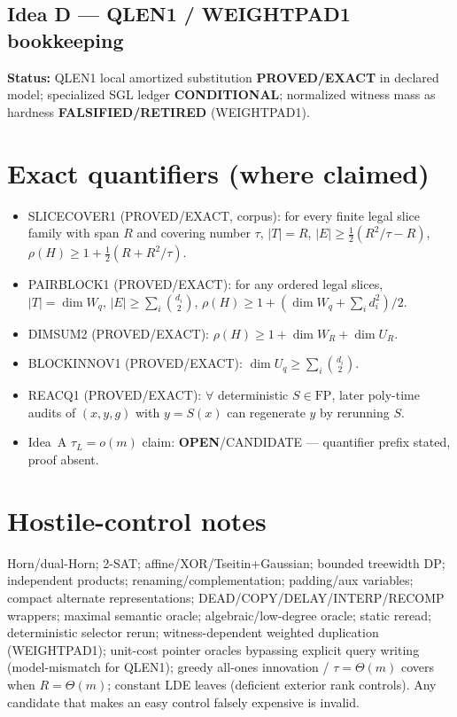 \documentclass[11pt]{article}
\begin{document}
\subsection*{Idea D --- QLEN1 / WEIGHTPAD1 bookkeeping}
\textbf{Status:} QLEN1 local amortized substitution \textbf{PROVED/EXACT} in declared model;
specialized SGL ledger \textbf{CONDITIONAL}; normalized witness mass as hardness
\textbf{FALSIFIED/RETIRED} (WEIGHTPAD1).

\section*{Exact quantifiers (where claimed)}
\begin{itemize}
\item SLICECOVER1 (PROVED/EXACT, corpus): for every finite legal slice family with span $R$ and
covering number $\tau$,
$|T|=R$, $|E|\ge\tfrac12(R^2/\tau-R)$,
$\rho(H)\ge 1+\tfrac12(R+R^2/\tau)$.
\item PAIRBLOCK1 (PROVED/EXACT): for any ordered legal slices,
$|T|=\dim W_q$, $|E|\ge\sum_i\binom{d_i}{2}$,
$\rho(H)\ge 1+(\dim W_q+\sum_i d_i^2)/2$.
\item DIMSUM2 (PROVED/EXACT): $\rho(H)\ge 1+\dim W_R+\dim U_R$.
\item BLOCKINNOV1 (PROVED/EXACT): $\dim U_q\ge\sum_i\binom{d_i}{2}$.
\item REACQ1 (PROVED/EXACT): $\forall$ deterministic $S\in\mathrm{FP}$, later poly-time audits
of $(x,y,g)$ with $y=S(x)$ can regenerate $y$ by rerunning $S$.
\item Idea~A $\tau_L=o(m)$ claim: \textbf{OPEN}/CANDIDATE --- quantifier prefix stated, proof absent.
\end{itemize}

\section*{Hostile-control notes}
Horn/dual-Horn; 2-SAT; affine/XOR/Tseitin+Gaussian; bounded treewidth DP; independent products;
renaming/complementation; padding/aux variables; compact alternate representations;
DEAD/COPY/DELAY/INTERP/RECOMP wrappers; maximal semantic oracle; algebraic/low-degree oracle;
static reread; deterministic selector rerun; witness-dependent weighted duplication (WEIGHTPAD1);
unit-cost pointer oracles bypassing explicit query writing (model-mismatch for QLEN1);
greedy all-ones innovation / $\tau=\Theta(m)$ covers when $R=\Theta(m)$;
constant LDE leaves (deficient exterior rank controls).
Any candidate that makes an easy control falsely expensive is invalid.
\end{document}
